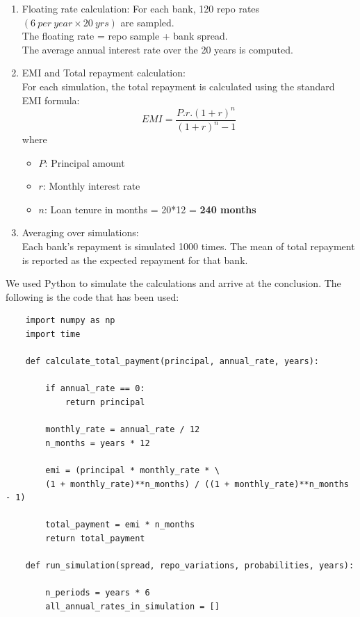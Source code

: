 \begin{itemize}
\begin{enumerate}
    \item Floating rate calculation:
    For each bank, 120 repo rates $(6\ per\ year \times 20\ yrs)$ are sampled.
    \\The floating rate = repo sample + bank spread.\\
    The average annual interest rate over the 20 years is computed.

    \item EMI and Total repayment calculation:\\
    For each simulation, the total repayment is calculated using the standard EMI formula:
    \[
    EMI = \frac{P.r.(1+r)^n}{(1+r)^n-1}
    \]
    where
    \begin{itemize}
        \item $P$: Principal amount
        \item $r$: Monthly interest rate
        \item $n$: Loan tenure in months = 20*12 = \textbf{240 months}
    \end{itemize}

    \item Averaging over simulations:\\
    Each bank's repayment is simulated 1000 times. The mean of total repayment is reported as the expected repayment for that bank.
\end{enumerate}

We used Python to simulate the calculations and arrive at the conclusion. The following is
the code that has been used:


\begin{verbatim}
    import numpy as np
    import time
    
    def calculate_total_payment(principal, annual_rate, years):
    
        if annual_rate == 0:
            return principal
    
        monthly_rate = annual_rate / 12
        n_months = years * 12
    
        emi = (principal * monthly_rate * \
        (1 + monthly_rate)**n_months) / ((1 + monthly_rate)**n_months - 1)
    
        total_payment = emi * n_months
        return total_payment
    
    def run_simulation(spread, repo_variations, probabilities, years):
    
        n_periods = years * 6
        all_annual_rates_in_simulation = []
    

\end{verbatim}
\end{itemize}
